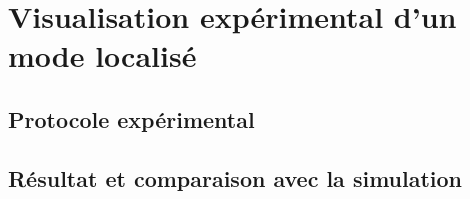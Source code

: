 \chapter{Visualisation expérimental d'un mode localisé}
\section{Protocole expérimental}
\section{Résultat et comparaison avec la simulation}
